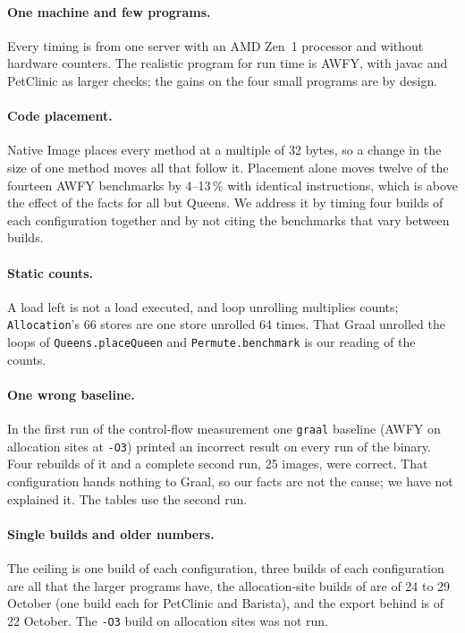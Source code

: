 \paragraph{One machine and few programs.} Every timing is from one server with an AMD Zen~1 processor and without hardware
counters. The realistic program for run time is AWFY, with javac and PetClinic as larger checks; the gains on the four small
programs are by design.

\paragraph{Code placement.} Native Image places every method at a multiple of 32 bytes, so a change in the size of one method
moves all that follow it. Placement alone moves twelve of the fourteen AWFY benchmarks by 4--13\,\% with identical instructions,
which is above the effect of the facts for all but Queens. We address it by timing four builds of each configuration together
and by not citing the benchmarks that vary between builds.

\paragraph{Static counts.} A load left is not a load executed, and loop unrolling multiplies counts; \texttt{Allocation}'s 66
stores are one store unrolled 64 times. That Graal unrolled the loops of \texttt{Queens.placeQueen} and \texttt{Permute.benchmark} is
our reading of the counts.

\paragraph{One wrong baseline.} In the first run of the control-flow measurement one \texttt{graal} baseline (AWFY on
allocation sites at \texttt{-O3}) printed an incorrect result on every run of the binary. Four rebuilds of it and a complete
second run, 25 images, were correct. That configuration hands nothing to Graal, so our facts are not the cause; we have not
explained it. The tables use the second run.

\paragraph{Single builds and older numbers.} The ceiling is one build of each configuration, three builds of each configuration
are all that the larger programs have, the allocation-site builds of  are of 24 to 29 October (one build each for PetClinic and Barista), and the export behind  is of 22 October. The \texttt{-O3} build on allocation sites was not run.
